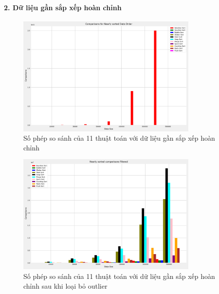 \paragraph{2. Dữ liệu gần sắp xếp hoàn chỉnh}
\begin{figure}[H]
    \centering
    \includegraphics[width=0.8\textwidth]{exprimental_result/images/nearly_sorted_comparisons.png}
    \caption{Số phép so sánh của 11 thuật toán với dữ liệu gần sắp xếp hoàn chỉnh}
\end{figure}

\begin{figure}[H]
    \centering
    \includegraphics[width=0.8\textwidth]{exprimental_result/images/nearly_sorted_comparisons_filtered.png}
    \caption{Số phép so sánh của 11 thuật toán với dữ liệu gần sắp xếp hoàn chỉnh sau khi loại bỏ outlier}
\end{figure}


